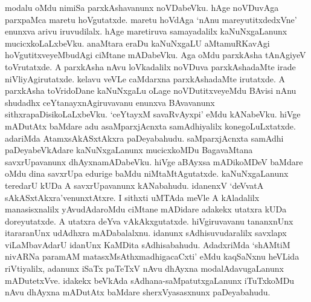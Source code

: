 modalu oMdu nimiSa parxkAshavanunx noVDabeVku. hAge noVDuvAga parxpaMca maretu hoVgutatxde. maretu hoVdAga `nAnu mareyutitxdedxVne' enunxva arivu iruvudilalx. hAge maretiruva samayadalilx kaNuNxgaLanunx mucicxkoLaLxbeVku. anaMtara eraDu kaNuNxgaLU aMtamuRKavAgi hoVgutitxveyeMbudAgi ciMtane mADabeVku. Aga oMdu parxkAsha tAnAgiyeV toVrutatxde. A parxkAsha nAvu loVkadalilx noVDuva parxkAshadaMte irade niVliyAgirutatxde. kelavu veVLe caMdarxna parxkAshadaMte irutatxde. A parxkAsha toVridoDane kaNuNxgaLu oLage noVDutitxveyeMdu BAvisi nAnu shudadhx ceYtanayxnAgiruvavanu enunxva BAvavanunx sithxrapaDisikoLaLxbeVku. `ceYtayxM savaRvAyxpi' eMdu kANabeVku. hiVge mADutAtx baMdare adu asaMparxjAcnxta samAdhiyalilx konegoLuLxtatxde. adariMda AtamxsAkASxtAkxra paDeyabahudu. saMparxjAcnxta samAdhi paDeyabeVkAdare kaNuNxgaLanunx mucicxkoMDu BagavaMtana savxrUpavanunx dhAyxnamADabeVku. hiVge aBAyxsa mADikoMDeV baMdare oMdu dina savxrUpa edurige baMdu niMtaMtAgutatxde. kaNuNxgaLanunx teredarU kUDa A savxrUpavanunx kANabahudu. idanenxV `deVvatA sAkASxtAkxra'venunxtAtxre. I sithxti uMTAda meVle A kAladalilx manasisxnalilx yAvudAdaroMdu ciMtane mADidare adakekx utatxra kUDa doreyutatxde. A utatxra deYva vAkAkxgutatxde. hiVgiruvavanu tananxnUnx itararanUnx udAdhxra mADabalalxnu. idanunx sAdhisuvudaralilx savxlapx viLaMbavAdarU idanUnx KaMDita sAdhisabahudu. AdadxriMda `shAMtiM nivARNa paramAM matasxMsAthxmadhigacaCxti' eMdu kaqSaNxnu heVLida riVtiyalilx, adanunx iSaTx paTeTxV nAvu dhAyxna modalAdavugaLanunx mADutetxVve. idakekx beVkAda sAdhana-saMpatutxgaLanunx iTuTxkoMDu nAvu dhAyxna mADutAtx baMdare sherxVyasasxnunx paDeyabahudu.
